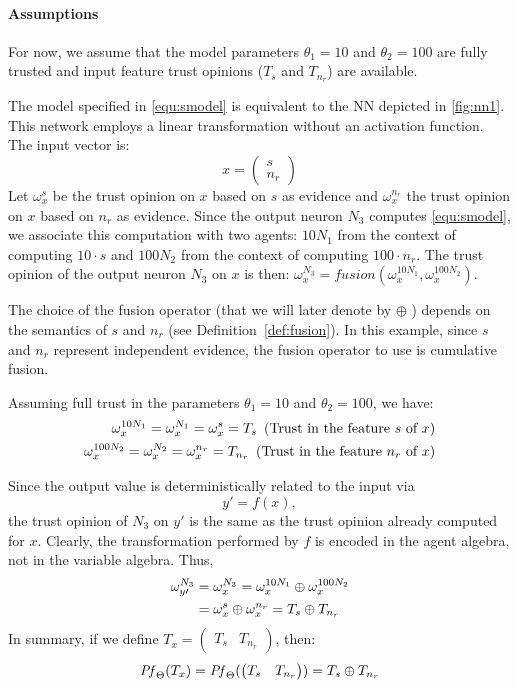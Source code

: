 \paragraph*{Assumptions} For now, we assume that the model parameters \(\theta_1=10\) and  \(\theta_2=100\) are fully trusted and input feature trust opinions (\(T_s\) and \(T_{n_r}\)) are available.

The model specified in \cref{equ:smodel} is equivalent to the NN depicted in \cref{fig:nn1}. This network employs a linear transformation without an activation function. The input vector is:
$$ 
x = \begin{pmatrix}
    s \\
    n_r
\end{pmatrix}
$$ 
Let $\omega_x^s$ be the trust opinion on $x$ based on $s$ as evidence and  $\omega_x^{n_r}$ the trust opinion on $x$ based on $n_r$ as evidence. Since the output neuron $N_3$ computes \cref{equ:smodel}, we associate this computation with two agents: $10N_1$ from the context of computing \(10\cdot s\) and $100N_2$ from the context of computing \(100\cdot n_r\). The trust opinion of the output neuron \(N_3\) on \(x\) is then: 
\(\omega_x^{N_3} = \mathit{fusion}(\omega_x^{10N_1}, \omega_x^{100N_2})\). 

The choice of the fusion operator (that we will later denote by \(\oplus\) ) depends on the semantics of \(s\) and \(n_r\) (see Definition~\ref{def:fusion}). In this example, since $s$ and $n_r$ represent independent evidence, the fusion operator to use is cumulative fusion.

Assuming full trust in the parameters \(\theta_1 = 10\) and \(\theta_2 = 100\), we have:
\begin{align}
    \omega_x^{10N_1} = \omega_x^{N_1} = \omega_x^{s} = T_s \, \text{ (Trust in the feature \(s\) of \(x\))} \notag \\
    \omega_x^{100N_2} = \omega_x^{N_2} = \omega_x^{n_r} = T_{n_r} \, \text{ (Trust in the feature \(n_r\) of \(x\))} \notag 
\end{align}

Since the output value is deterministically related to the input via
\[
y' = f(x),
\]
the trust opinion of \(N_3\) on \(y'\) is the same as the trust opinion already computed for \(x\). Clearly, the transformation performed by \(f\) is encoded in the agent algebra, not in the variable algebra. Thus,
\begin{align}
    \omega_{y\prime}^{N_3} &= \omega_x^{N_3} = \omega_x^{10N_1} \oplus \omega_x^{100N_2} \notag \notag \\
&= \omega_x^{s} \oplus \omega_x^{n_r} = T_s \oplus T_{n_r}
\end{align}
In summary, if we define \(T_x = \begin{pmatrix}
    T_s&T_{n_r}
\end{pmatrix} \), then:
\[\mathit{Pf}_\Theta(T_x) = \mathit{Pf}_\Theta(\begin{pmatrix}
    T_s&T_{n_r}
\end{pmatrix}) =  T_s \oplus T_{n_r} \]


